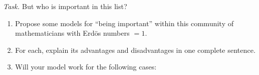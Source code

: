 \emph{Task.} But who is important in this list?

\begin{enumerate}[label=\emph{\arabic*.}]
	\item Propose some models for ``being important'' within this community of mathematicians with Erd{\"o}s numbers $ = 1 $.
	\item For each, explain its advantages and disadvantages in one complete sentence.
	
	\item Will your model work for the following cases:
\end{enumerate}

\def\star#1#2{
  \draw (#1,#2) node {\tikzcircle[black,fill=black]{1pt}};
  \foreach \a in {0,60,120,180,240,300} {
    \draw (#1,#2) -- ({#1+cos(\a)},{#2+sin(\a)}) node {\tikzcircle[black,fill=black]{1pt}};
  }
}
\def\starseven#1#2#3{
  \draw (#1,#2) node {\tikzcircle[black,fill=black]{1pt}};
  \foreach \a in {31.4,82.8,134.2,185.6,237,288.4,339.8} {
    \draw (#1,#2) -- ({#1+cos(\a+#3)},{#2+sin(\a+#3)}) node {\tikzcircle[black,fill=black]{1pt}};
  }
}


